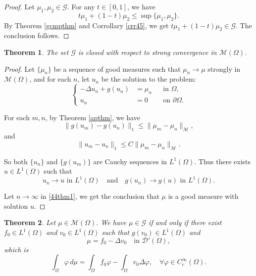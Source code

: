 \documentclass[a4paper, 11pt]{report}
\newtheorem{thm}{Theorem}[chapter]
\theoremstyle{definition}\newtheorem*{rmk}{Remark}
\begin{document}
\begin{proof}
Let $\mu_1, \mu_2 \in \mathcal{G}$. For any $t \in [0,1]$, we have 
\[
t\mu_1 + (1-t)\mu_2 \le \sup \{\mu_1, \mu_2\}.
\]
By Theorem \ref{gcmpthm} and Corrollary \ref{crr45}, we get $t\mu_1 + (1-t)\mu_2 \in \mathcal{G}$. The conclusion follows.
\end{proof}

\begin{thm}
The set $\mathcal{G}$ is closed with respect to strong convergence in $\mathcal{M}(\Omega)$.
\end{thm}

\begin{proof}
Let $\{\mu_n\}$ be a sequence of good measures such that $\mu_n \to \mu$ strongly in $\mathcal{M}(\Omega)$, and for each $n$, let $u_n$ be the solution to the problem:
\begin{equation}\label{44thm1}
\left\{
\begin{aligned}
-\Delta u_{n} + g(u_{n}) & = \mu_n && \text{in } \Omega , \\
u_{n} & = 0 && \text{on } \partial \Omega.
\end{aligned}
\right.
\end{equation}

For each $m,n$, by Theorem \ref{apthm}, we have
\[
\| g(u_m)-g(u_n)\|_1 \leq \| \mu_m - \mu_n \|_{\mathcal{M}},
\]
and
\[
\| u_m-u_n\|_1 \leq C\| \mu_m - \mu_n \|_{\mathcal{M}}.
\]

So both $\{u_n\}$ and $\{g(u_m)\}$ are Cauchy sequences in $L^1(\Omega)$. Thus there exists $u \in L^1(\Omega)$ such that
\[
u_n \to u \text{ in }L^1(\Omega) \quad\text{and} \quad g(u_n)\to g(u) \text{ in } L^1(\Omega).
\]

Let $n \to \infty$ in \eqref{44thm1}, we get the conclusion that $\mu$ is a good measure with solution $u$.
\end{proof}

\begin{thm}\label{thm45}
Let $\mu \in \mathcal{M}(\Omega)$. We have $\mu \in \mathcal{G}$ if and only if there exist $f_0 \in L^1(\Omega)$ and $v_0 \in L^1(\Omega)$ such that $g(v_0) \in L^1(\Omega)$ and
\[
\mu = f_0 - \Delta v_0 \quad \text{in } \mathcal{D}'(\Omega),
\]
which is
\begin{equation}\label{thm441}
\int_{\Omega} \varphi \,d\mu = \int_{\Omega}f_0\varphi - \int_{\Omega}v_0\Delta \varphi, \quad \forall \varphi \in C_c^{\infty}(\Omega).
\end{equation}
\end{thm}
\end{document}
